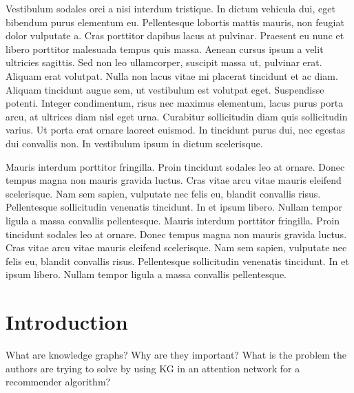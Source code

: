 \documentclass[a4paper]{LTJournalArticle}
\begin{document}
	Vestibulum sodales orci a nisi interdum tristique. In dictum vehicula dui, eget bibendum purus elementum eu. Pellentesque lobortis mattis mauris, non feugiat dolor vulputate a. Cras porttitor dapibus lacus at pulvinar. Praesent eu nunc et libero porttitor malesuada tempus quis massa. Aenean cursus ipsum a velit ultricies sagittis. Sed non leo ullamcorper, suscipit massa ut, pulvinar erat. Aliquam erat volutpat. Nulla non lacus vitae mi placerat tincidunt et ac diam. Aliquam tincidunt augue sem, ut vestibulum est volutpat eget. Suspendisse potenti. Integer condimentum, risus nec maximus elementum, lacus purus porta arcu, at ultrices diam nisl eget urna. Curabitur sollicitudin diam quis sollicitudin varius. Ut porta erat ornare laoreet euismod. In tincidunt purus dui, nec egestas dui convallis non. In vestibulum ipsum in dictum scelerisque.
	
	Mauris interdum porttitor fringilla. Proin tincidunt sodales leo at ornare. Donec tempus magna non mauris gravida luctus. Cras vitae arcu vitae mauris eleifend scelerisque. Nam sem sapien, vulputate nec felis eu, blandit convallis risus. Pellentesque sollicitudin venenatis tincidunt. In et ipsum libero. Nullam tempor ligula a massa convallis pellentesque. Mauris interdum porttitor fringilla. Proin tincidunt sodales leo at ornare. Donec tempus magna non mauris gravida luctus. Cras vitae arcu vitae mauris eleifend scelerisque. Nam sem sapien, vulputate nec felis eu, blandit convallis risus. Pellentesque sollicitudin venenatis tincidunt. In et ipsum libero. Nullam tempor ligula a massa convallis pellentesque.
	
		
		
	\section{Introduction}
	What are knowledge graphs? Why are they important? What is the problem the authors are trying to solve by using KG in an attention network for a recommender algorithm?
\end{document}
